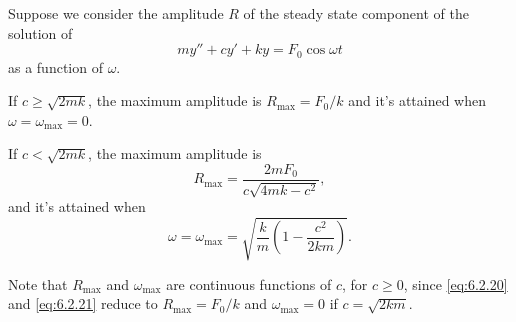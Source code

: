 \begin{theorem}\label{thmtype:6.2.1}
 Suppose we consider the amplitude $R$ of the steady state
component of the solution of
\[
my''+cy'+ky=F_0\cos\omega t
\]
as a function of $\omega$.
\begin{alist}
\item If $c\ge\sqrt{2mk}$,  the maximum amplitude is
 $R_{\max}=F_0/k$ and it's attained when $\omega=
\omega_{\max}=0$.
\item If $c<\sqrt{2mk}$, the maximum amplitude is
\begin{equation}\label{eq:6.2.20}
R_{\max}=\frac{2m F_0}{c\sqrt{4mk-c^2}},
\end{equation}
and it's attained when
\begin{equation}\label{eq:6.2.21}
\omega=\omega_{\max}=\sqrt{\frac{k}{m}\left(1-\frac{c^2}{2km}\right)}.
\end{equation}
\end{alist}
\end{theorem}
Note that $R_{\max}$ and $\omega_{\max}$ are continuous functions
of $c$, for $c\ge0$, since  \eqref{eq:6.2.20} and  \eqref{eq:6.2.21} reduce
to $R_{\max}=F_0/k$ and $\omega_{\max}=0$ if $c=\sqrt{2km}$.

